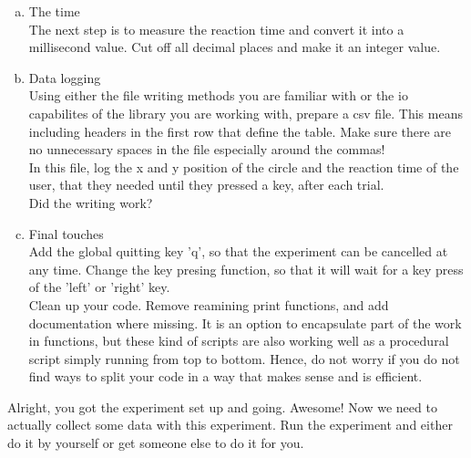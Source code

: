 \begin{enumerate}[a)]
\item The time\\
The next step is to measure the reaction time and convert it into a millisecond
value. Cut off all decimal places and make it an integer value.

\item Data logging\\
Using either the file writing methods you are familiar with or the io
capabilites of the library you are working with, prepare a csv file. This
means including headers in the first row that define the table. Make sure there
are no unnecessary spaces in the file especially around the commas!\\
In this file, log the x and y position of the circle and the reaction time
of the user, that they needed until they pressed a key, after each trial.\\
Did the writing work?

\item Final touches\\
Add the global quitting key 'q', so that the experiment can be cancelled at any time.
Change the key presing function, so that it will wait for a key press of the 'left' or
'right' key.\\
Clean up your code. Remove reamining print functions, and add documentation where missing.
It is an option to encapsulate part of the work in functions, but these kind of scripts
are also working well as a procedural script simply running from top to bottom. Hence,
do not worry if you do not find ways to split your code in a way that makes sense and is
efficient.
\end{enumerate}

\noindent Alright, you got the experiment set up and going. Awesome! Now we need to
actually collect some data with this experiment. Run the experiment and either do it by 
yourself or get someone else to do it for you.


